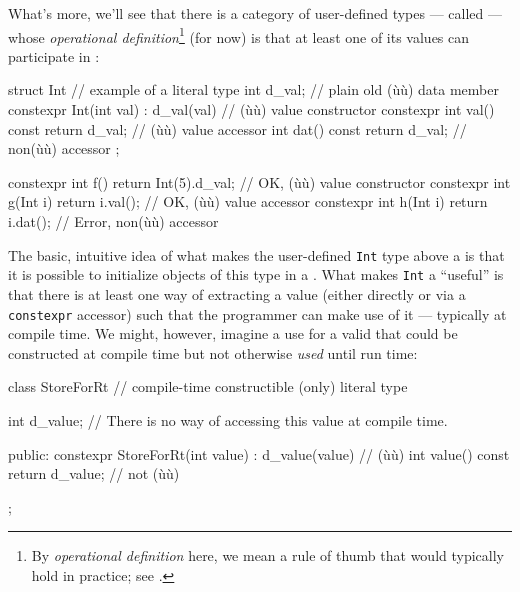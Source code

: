 What's more, we'll see that there is a category of user-defined types
--- called  --- whose \emph{operational
definition}{\cprotect\footnote{By \emph{operational definition} here, we
mean a rule of thumb that would typically hold in practice; see
.}} (for now) is that at
least one of its values can participate in :

\begin{emcppslisting}
struct Int  // example of a literal type
{
    int d_val;                                   // plain old (ù{}ù) data member
    constexpr Int(int val) : d_val(val) { }      // (ù{}ù) value constructor
    constexpr int val() const { return d_val; }  // (ù{}ù) value accessor
              int dat() const { return d_val; }  // non(ù{}ù) accessor
};

constexpr int f(){ return Int(5).d_val; }  // OK, (ù{}ù) value constructor
constexpr int g(Int i){ return i.val(); }  // OK, (ù{}ù) value accessor
constexpr int h(Int i){ return i.dat(); }  // Error, non(ù{}ù) accessor
\end{emcppslisting}
    

\noindent The basic, intuitive idea of what makes the user-defined \lstinline!Int!
type above a  is that it is possible to initialize
objects of this type in a . What makes
\lstinline!Int! a ``useful''  is that there is at
least one way of extracting a value (either directly or via a
\lstinline!constexpr! accessor) such that the programmer can make use of it
--- typically at compile time. We might, however, imagine a use for a
valid  that could be constructed at compile time
but not otherwise \emph{used} until run time:

\begin{emcppslisting}[emcppsbatch=e4]
class StoreForRt   // compile-time constructible (only) literal type
{
    int d_value;   // There is no way of accessing this value at compile time.

public:
    constexpr StoreForRt(int value) : d_value(value) { }  //       (ù{}ù)
    int value() const { return d_value; }                 // not (ù{}ù)
};
\end{emcppslisting}
    

